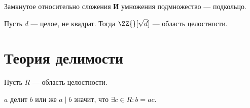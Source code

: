 \documentclass[12pt,a4paper]{article}
\begin{document}
    \begin{remark}
        Замкнутое относительно сложения \textbf{И} умножения подмножество --- подкольцо.
    \end{remark}

    \begin{example}
        Пусть $d$ --- целое, не квадрат. Тогда $\ZZ{}[\sqrt{d}]$ --- область целостности.
    \end{example}

    \section{Теория делимости}

    Пусть $R$ --- область целостности.

    \begin{definition}
        $a$ делит $b$ или же $a \mid b$ значит, что $\exists c \in R: b = ac$.
    \end{definition}

    \begin{statement}
        
    \end{statement}
\end{document}
